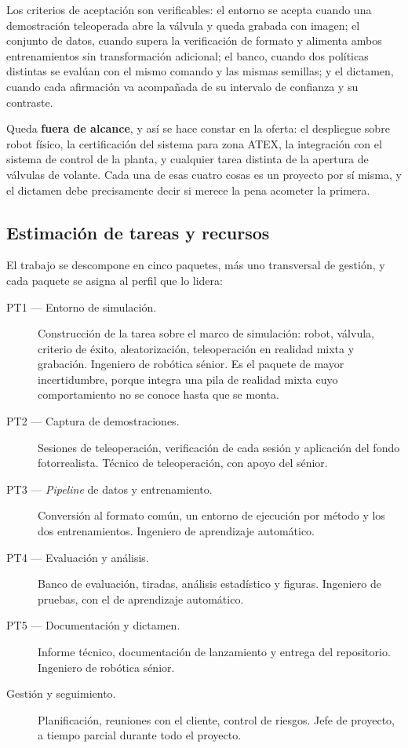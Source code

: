 Los criterios de aceptación son verificables: el entorno se acepta cuando una demostración
teleoperada abre la válvula y queda grabada con imagen; el conjunto de datos, cuando supera la
verificación de formato y alimenta ambos entrenamientos sin transformación adicional; el banco,
cuando dos políticas distintas se evalúan con el mismo comando y las mismas semillas; y el dictamen,
cuando cada afirmación va acompañada de su intervalo de confianza y su contraste.

Queda \textbf{fuera de alcance}, y así se hace constar en la oferta: el despliegue sobre robot
físico, la certificación del sistema para zona ATEX, la integración con el sistema de control de la
planta, y cualquier tarea distinta de la apertura de válvulas de volante. Cada una de esas cuatro
cosas es un proyecto por sí misma, y el dictamen debe precisamente decir si merece la pena acometer
la primera.

\subsection{Estimación de tareas y recursos}

El trabajo se descompone en cinco paquetes, más uno transversal de gestión, y cada paquete se asigna
al perfil que lo lidera:

\begin{description}
	\item[PT1 — Entorno de simulación.] Construcción de la tarea sobre el marco de simulación:
	robot, válvula, criterio de éxito, aleatorización, teleoperación en realidad mixta y grabación.
	Ingeniero de robótica sénior. Es el paquete de mayor incertidumbre, porque integra una pila
	de realidad mixta cuyo comportamiento no se conoce hasta que se monta.
	\item[PT2 — Captura de demostraciones.] Sesiones de teleoperación, verificación de cada sesión
	y aplicación del fondo fotorrealista. Técnico de teleoperación, con apoyo del sénior.
	\item[PT3 — \textit{Pipeline} de datos y entrenamiento.] Conversión al formato común, un
	entorno de ejecución por método y los dos entrenamientos. Ingeniero de aprendizaje automático.
	\item[PT4 — Evaluación y análisis.] Banco de evaluación, tiradas, análisis estadístico y
	figuras. Ingeniero de pruebas, con el de aprendizaje automático.
	\item[PT5 — Documentación y dictamen.] Informe técnico, documentación de lanzamiento y
	entrega del repositorio. Ingeniero de robótica sénior.
	\item[Gestión y seguimiento.] Planificación, reuniones con el cliente, control de riesgos.
	Jefe de proyecto, a tiempo parcial durante todo el proyecto.
\end{description}

